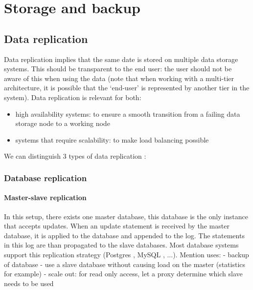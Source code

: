 \documentclass[12pt]{report}
\begin{document}
\section{Storage and backup}

\subsection{Data replication}
Data replication implies that the same date is stored on multiple
data storage systems. This should be transparent to the end user: the
user should not be aware of this when using the data (note that when
working with a multi-tier architecture, it is possible that the
`end-user'  is represented by another tier in the system).
Data replication is relevant for both:
\begin{itemize}
\item high availability systems: to ensure a smooth transition from a
  failing data storage node to a working node
\item systems that require scalability: to make load balancing possible
\end{itemize}
We can distinguish 3 types of data replication
\cite{datareplication:2013} :

\subsubsection{Database replication}

\paragraph*{Master-slave replication}
In this setup, there exists one master database, this database is the only instance
that accepts updates. When an update statement is received by the
master database, it is applied to the database and appended to the log. The statements
in this log are than propagated to the slave databases.
Most database systems support this replication strategy (Postgres \cite{postgres_db:2013},
MySQL \cite{mysql_db:2013}, ...).
Mention uses:
- backup of database
- use a slave database without causing load on the master (statistics
for example)
- scale out: for read only access, let a proxy determine which slave
needs to be used
\end{document}
